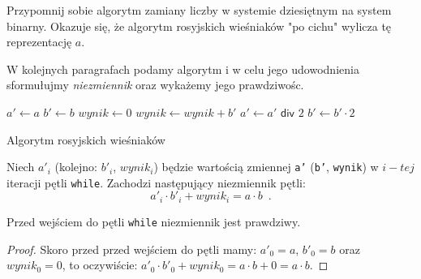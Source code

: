 Przypomnij sobie algorytm zamiany liczby w systemie dziesiętnym na system binarny.
Okazuje się, że algorytm rosyjskich wieśniaków "po cichu" wylicza tę reprezentację $a$.

W kolejnych paragrafach podamy algorytm i w celu jego udowodnienia sformułujmy \textit{niezmiennik} oraz wykażemy jego prawdziwośc.

\begin{algorithm}[h]
  \DontPrintSemicolon
  
  
  
  $a' \leftarrow a$\;
  $b' \leftarrow b$\;
  $wynik \leftarrow 0$\;
  {
    {
      $wynik \leftarrow wynik + b'$\;
    }
    $a' \leftarrow a' \textsf{ div } 2$\;
    $b' \leftarrow b' \cdot 2$\;
  }
  
  \caption{Algorytm rosyjskich wieśniaków}
  \label{alg-wiesniakow}
\end{algorithm}

\begin{theorem}
Niech $a'_i$ (kolejno: $b'_i$, $wynik_i$) będzie wartością zmiennej \texttt{a'} (\texttt{b'}, \texttt{wynik}) w $i-tej$ iteracji pętli \texttt{while}. Zachodzi następujący niezmiennik pętli:
\[
a'_i \cdot b'_i + wynik_i = a \cdot b \enspace.
\]
\end{theorem}

\begin{lemma}
Przed wejściem do pętli \texttt{while} niezmiennik jest prawdziwy.
\end{lemma}
\begin{proof}
Skoro przed przed wejściem do pętli mamy: $a'_0 = a$, $b'_0 = b$ oraz $wynik_0 = 0$, to oczywiście: $a'_0 \cdot b'_0 + wynik_0 = a \cdot b + 0 = a \cdot b$.
\end{proof}


